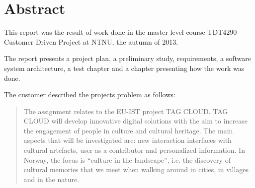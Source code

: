 \documentclass[11pt]{book}
\begin{document}
\begin{titlepage}
\begin{center}
        
        
        
    \end{center}
        
\end{titlepage}

\color{black}

\chapter{Abstract}
This report was the result of work done in the master level course TDT4290 - Customer Driven Project at NTNU, the autumn of 2013.

The report presents a project plan, a preliminary study, requirements, a software system architecture, a test chapter and a chapter presenting how the work was done.

The customer described the projects problem as follows:
\begin{quotation}\noindent
The assignment relates to the EU-IST project TAG CLOUD. TAG CLOUD will develop innovative digital solutions with the aim to increase the engagement of people in culture and cultural heritage. The main aspects that will be investigated are: new interaction interfaces with cultural artefacts, user as a contributor and personalized information. In Norway, the focus is ``culture in the landscape'', i.e. the discovery of cultural memories that we meet when walking around in cities, in villages and in the nature. \cite[p. 47]{compendium}
\end{quotation}
\end{document}
